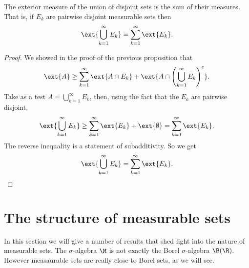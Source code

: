 \documentclass[12pt,oneside]{book}
\begin{document}
\begin{proposition}
	The exterior measure of the union of disjoint sets is the sum of their measures. That is, if \( E_k \) are pairwise disjoint measurable sets then
	\begin{equation*}
		\ext{\bigcup_{k = 1}^\infty E_k} = \sum_{k = 1}^{\infty} \ext{E_k}. 
	\end{equation*}
\end{proposition}
\begin{proof}
	We showed in the proof of the previous proposition that
	\begin{equation*}
		\ext{A} \geq \sum_{k = 1}^\infty \ext{A \cap E_k} + \ext{A \cap \left(\bigcup_{k = 1}^\infty E_k\right)^c}.
	\end{equation*}
	Take as a test \( A = \bigcup_{k = 1}^\infty E_k \), then, using the fact that the \( E_k \) are pairwise disjoint,
	\begin{equation*}
		\ext{\bigcup_{k = 1}^\infty E_k} \geq \sum_{k = 1}^\infty \ext{E_k} + \ext{\emptyset} = \sum_{k = 1}^\infty \ext{E_k}.
	\end{equation*}
	The reverse inequality is a statement of subadditivity. So we get
	\begin{equation*}
		\ext{\bigcup_{k = 1}^\infty E_k} = \sum_{k = 1}^\infty \ext{E_k}.
	\end{equation*}
\end{proof}

\section{The structure of measurable sets}
In this section we will give a number of results that shed light into the nature of measurable sets. The \( \sigma \)-algebra \( \M \) is not exactly the Borel \( \sigma \)-algebra \( \B(\R) \). However measaurable sets are really close to Borel sets, as we will see.
\end{document}
